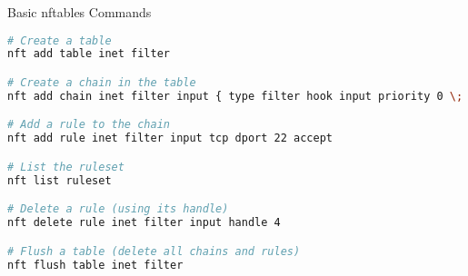 \begin{code}{Basic nftables Commands}\\
\begin{lstlisting}[language=bash, style=basesmol]
# Create a table
nft add table inet filter

# Create a chain in the table
nft add chain inet filter input { type filter hook input priority 0 \; policy drop \; }

# Add a rule to the chain
nft add rule inet filter input tcp dport 22 accept

# List the ruleset
nft list ruleset

# Delete a rule (using its handle)
nft delete rule inet filter input handle 4

# Flush a table (delete all chains and rules)
nft flush table inet filter
\end{lstlisting}
\end{code}

